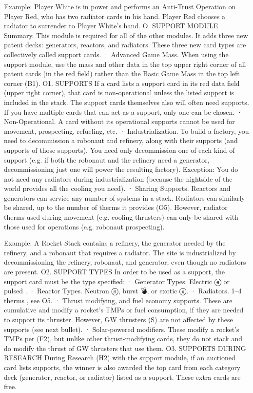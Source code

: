 \documentclass[a4paper]{book}
\begin{document}
Example: Player White is in power and performs an Anti-Trust Operation on Player Red, who has two radiator cards in his hand. Player Red chooses a radiator to surrender to Player White's hand.
O. SUPPORT MODULE
Summary. This module is required for all of the other modules. It adds three new patent decks: generators, reactors, and radiators. These three new card types are collectively called support cards.
·       Advanced Game Mass. When using the support module, use the mass and other data in the top upper right corner of all patent cards (in the red field) rather than the Basic Game Mass in the top left corner (B1).
O1. SUPPORTS
If a card lists a support card in its red data field (upper right corner), that card is non-operational unless the listed support is included in the stack. The support cards themselves also will often need supports. If you have multiple cards that can act as a support, only one can be chosen.
·       Non-Operational. A card without its operational supports cannot be used for movement, prospecting, refueling, etc.
·       Industrialization. To build a factory, you need to decommission a robonaut and refinery, along with their supports (and supports of those supports). You need only decommission one of each kind of support (e.g. if both the robonaut and the refinery need a generator, decommissioning just one will power the resulting factory). Exception: You do not need any radiators during industrialization (because the nightside of the world provides all the cooling you need).
·   	Sharing Supports. Reactors and generators can service any number of systems in a stack. Radiators can similarly be shared, up to the number of therms it provides (O5). However, radiator therms used during movement (e.g. cooling thrusters) can only be shared with those used for operations (e.g. robonaut prospecting).

Example: A Rocket Stack contains a refinery, the generator needed by the refinery, and a robonaut that requires a radiator. The site is industrialized by decommissioning the refinery, robonaut, and generator, even though no radiators are present.
O2. SUPPORT TYPES
In order to be used as a support, the support card must be the type specified:
·   	Generator Types. Electric ⓔ or pulsed .
·   	Reactor Types. Neutron ⓝ, burst 💣, or exotic ⓧ.
·   	Radiators. 1–4 therms , see O5.
·   	Thrust modifying, and fuel economy supports. These are cumulative and modify a rocket’s TMPs or fuel consumption, if they are needed to support its thruster. However, GW thrusters (S) are not affected by these supports (see next bullet).
·   	Solar-powered modifiers. These modify a rocket’s TMPs per (F2), but unlike other thrust-modifying cards, they do not stack and do modify the thrust of GW thrusters that use them.
O3. SUPPORTS DURING RESEARCH
During Research (H2) with the support module, if an auctioned card lists supports, the winner is also awarded the top card from each category deck (generator, reactor, or radiator) listed as a support. These extra cards are free.
\end{document}
